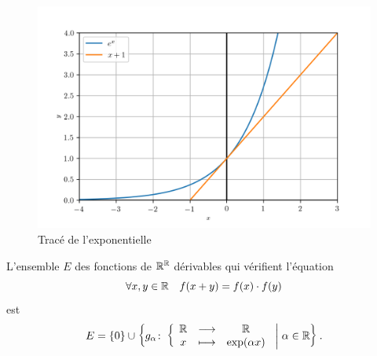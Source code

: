 \begin{figure}
  \centering
  \includegraphics[scale=0.6]{exp.png}
  \caption{Tracé de l'exponentielle}
  \label{fig:traceexp}
\end{figure}
%
\begin{theo}
  L'ensemble \(E\) des fonctions de \(\mathbb{R}^{\mathbb{R}}\) dérivables qui vérifient l'équation
  \begin{equation}
    \label{eq:foncexp}
    \forall x, y \in \mathbb{R} \quad f(x+y)=f(x) \cdot f(y)
  \end{equation}
  est
  \begin{equation}
    E=\left\{0\right\} \cup \left\{g_{\alpha}\colon \left\{\begin{array}{ccc} \mathbb{R} & \longrightarrow &\mathbb{R}\\ x & \longmapsto & \exp(\alpha x) \end{array} \right.\mathrel{}\middle|\mathrel{}\alpha \in \mathbb{R}\right\}.
  \end{equation}
\end{theo}
